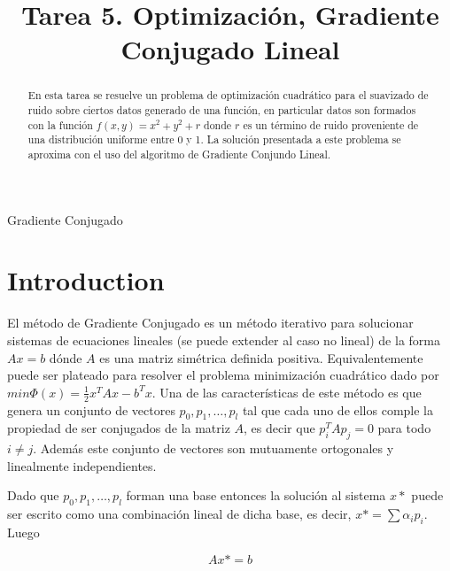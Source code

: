 \documentclass[conference]{IEEEtran}
\begin{document}
\title{Tarea 5. Optimización, Gradiente Conjugado Lineal}

\author{
}

\maketitle

\begin{abstract}
En esta tarea se resuelve un problema de optimización cuadrático para el suavizado de ruido sobre
ciertos datos generado de una función, en particular datos son formados con la función
$f(x,y) = x^2 + y^2 + r$ donde $r$ es un término de ruido proveniente de una distribución
uniforme entre 0 y 1. La solución presentada a este problema se aproxima con el uso del
algoritmo de Gradiente Conjundo Lineal.


\end{abstract}

\begin{IEEEkeywords}
Gradiente Conjugado
\end{IEEEkeywords}

\section{Introduction}

El método de Gradiente Conjugado es un método iterativo para solucionar sistemas de ecuaciones
lineales (se puede extender al caso no lineal) de la forma $Ax = b$ dónde $A$ es una matriz simétrica definida positiva. Equivalentemente
puede ser plateado para resolver el problema minimización cuadrático dado por
$min \Phi(x) = \frac{1}{2} x^T A x - b^Tx$. Una de las características de este método es que genera
un conjunto de vectores ${p_0, p_1, \dots, p_l}$ tal que cada uno de ellos comple la propiedad de
ser conjugados de la matriz $A$, es decir que $p_i^T A p_j=0$ para todo $i \ne j$. Además este
conjunto de vectores son mutuamente ortogonales y linealmente independientes.

Dado que ${p_0, p_1, \dots, p_l}$ forman una base entonces la solución al sistema $x*$ puede ser
escrito como una combinación lineal de dicha base, es decir, $x* = \sum \alpha_i p_i$. Luego

\begin{equation*}
	Ax* = b
\end{equation*}
\end{document}
